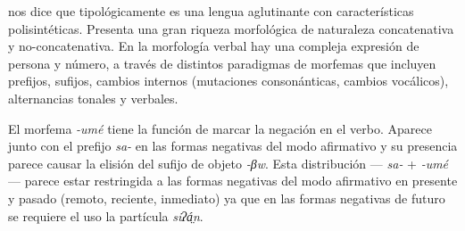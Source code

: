 \textcolor{MidnightBlue}{\citet{chichimeco}} nos dice que tipológicamente es una lengua aglutinante con características polisintéticas. Presenta una gran riqueza morfológica de naturaleza concatenativa y no-concatenativa. En la morfología verbal hay una compleja expresión de persona y número, a través de distintos paradigmas de morfemas que incluyen prefijos, sufijos, cambios internos (mutaciones consonánticas, cambios vocálicos), alternancias tonales y verbales.

El morfema {\setmainfont{Charis SIL} \textit{-umé}} tiene la función de marcar la negación en el verbo. Aparece junto con el prefijo {\setmainfont{Charis SIL} \textit{sa-}} en las formas negativas del modo afirmativo y su presencia parece causar la elisión del sufijo de objeto {\setmainfont{Charis SIL}\textit{-βw}}. Esta distribución —{\setmainfont{Charis SIL} \textit{sa-}} + {\setmainfont{Charis SIL} \textit{-umé}}— parece estar restringida a las formas negativas del modo afirmativo en presente y pasado (remoto, reciente, inmediato) ya que en las formas negativas de futuro se requiere el uso la partícula {\setmainfont{Charis SIL}\textit{siʔá̤n}.}

